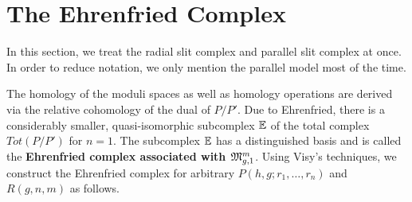 \section{The Ehrenfried Complex}
\label{cellular_models:ehrenfried}
In this section, we treat the radial slit complex and parallel slit complex at once.
In order to reduce notation, we only mention the parallel model most of the time.

The homology of the moduli spaces as well as homology operations are derived via the relative cohomology of the dual of $P/P'$.
Due to Ehrenfried, there is a considerably smaller, quasi-isomorphic subcomplex $\E$ of the total complex $Tot(P/P')$ for $n=1$.
The subcomplex $\E$ has a distinguished basis and is called the {\bfseries Ehrenfried complex associated with $\Modspc[1]$}.
Using Visy's techniques, we construct the Ehrenfried complex for arbitrary $P(h,g;r_1, \ldots, r_n)$ and $R(g,n,m)$ as follows.



